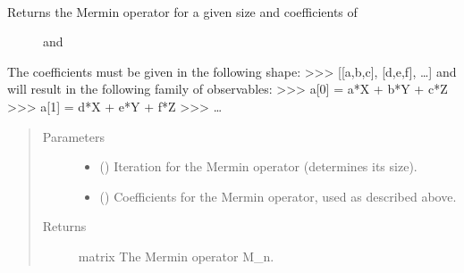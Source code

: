 \documentclass[letterpaper,10pt,english]{sphinxmanual}
\begin{document}
\begin{fulllineitems}
\label{\detokenize{mermin_eval:mermin_eval.M_from_coef_all}}~\begin{description}
\item[{Returns the Mermin operator for a given size  and coefficients of  }] \leavevmode
and 

\end{description}

The coefficients must be given in the following shape:
\textgreater{}\textgreater{}\textgreater{} {[}{[}a,b,c{]}, {[}d,e,f{]}, …{]}
and will result in the following family of observables:
\textgreater{}\textgreater{}\textgreater{} a{[}0{]} = a*X + b*Y + c*Z
\textgreater{}\textgreater{}\textgreater{} a{[}1{]} = d*X + e*Y + f*Z
\textgreater{}\textgreater{}\textgreater{} …
\begin{quote}\begin{description}
\item[{Parameters}] \leavevmode\begin{itemize}
\item {} 
 () \textendash{} Iteration for the Mermin operator (determines its size).

\item {} 
\sphinxstyleliteralstrong{\sphinxupquote{, }} (\sphinxstyleliteralemphasis{\sphinxupquote{{[}}}\sphinxstyleliteralemphasis{\sphinxupquote{{[}}}\sphinxstyleliteralemphasis{\sphinxupquote{{]}}}\sphinxstyleliteralemphasis{\sphinxupquote{{]}}}) \textendash{} Coefficients for the Mermin 
operator, used as described above.

\end{itemize}

\item[{Returns}] \leavevmode
matrix \textendash{} The Mermin operator M\_n.

\end{description}\end{quote}

\end{fulllineitems}
\end{document}

